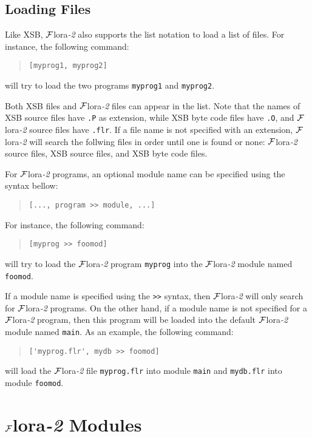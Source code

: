 \documentclass[11pt]{article}
\newcommand{\FLORA}{{\mbox{${\cal F}${\sc lora}\rm\emph{-2}}}\xspace}
\begin{document}
\subsection{Loading Files}


%
Like XSB, \FLORA also supports the list notation to load a list of
files. For instance, the following command:
\begin{quote}
\verb|[myprog1, myprog2]|
\end{quote}
will try to load the two programs {\tt myprog1} and {\tt myprog2}.

Both XSB files and \FLORA files can appear in the list. Note
that the names of XSB source files have {\tt .P} as extension,
while XSB byte code files have {\tt .O}, and \FLORA source files
have {\tt .flr}. If a file name is not specified with an extension,
\FLORA will search the follwing files in order until one is found
or none: \FLORA source files, XSB source files, and XSB byte code
files.

For \FLORA programs, an optional module name can be specified using
the syntax bellow:
\begin{quote}
\verb|[..., program >> module, ...]|
\end{quote}
For instance, the following command:
\begin{quote}
\verb|[myprog >> foomod]|
\end{quote}
will try to load the \FLORA program {\tt myprog} into the \FLORA
module named {\tt foomod}.

If a module name is specified using the {\tt >>} syntax, then
\FLORA will only search for \FLORA programs. On the other hand,
if a module name is not specified for a \FLORA program, then this
program will be loaded into the default \FLORA module named
{\tt main}. As an example, the following command:
\begin{quote}
\verb|['myprog.flr', mydb >> foomod]|
\end{quote}
will load the \FLORA file {\tt myprog.flr} into module {\tt main} and
{\tt mydb.flr} into module {\tt foomod}.


\section{\FLORA Modules} \label{sec:flora-modules}
\end{document}
